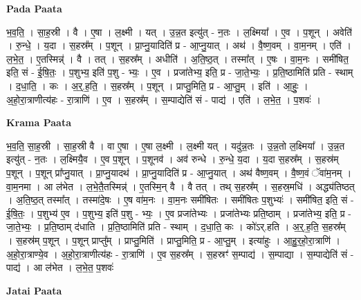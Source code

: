 \documentclass[17pt]{extarticle}
\begin{document}
\textbf{Pada Paata} \newline

भ॒व॒ति॒ । सा॒ह॒स्री । वै । ए॒षा । ल॒क्ष्मी । यत् । उ॒न्न॒त इत्यु॑त् - न॒तः । ल॒क्ष्मिया᳚ । ए॒व । प॒शून् । अवेति॑ । रु॒न्धे॒ । य॒दा । स॒हस्र᳚म् । प॒शून् । प्रा॒प्नु॒यादिति॑ प्र - आ॒प्नु॒यात् । अथ॑ । वै॒ष्ण॒वम् । वा॒म॒नम् । एति॑ । ल॒भे॒त॒ । ए॒तस्मिन्न्॑ । वै । तत् । स॒हस्र᳚म् । अधीति॑ । अ॒ति॒ष्ठ॒त् । तस्मा᳚त् । ए॒षः । वा॒म॒नः । समी॑षित॒ इति॒ सं - ई॒षि॒तः॒ । प॒शुभ्य॒ इति॑ प॒शु - भ्यः॒ । ए॒व । प्रजा॑तेभ्य॒ इति॒ प्र - जा॒ते॒भ्यः॒ । प्र॒ति॒ष्ठामिति॑ प्रति - स्थाम् । द॒धा॒ति॒ । कः । अ॒र्॒.ह॒ति॒ । स॒हस्र᳚म् । प॒शून् । प्राप्तु॒मिति॒ प्र - आ॒प्तु॒म् । इति॑ । आ॒हुः॒ । अ॒हो॒रा॒त्राणीत्य॑हः - रा॒त्राणि॑ । ए॒व । स॒हस्र᳚म् । स॒म्पाद्येति॑ सं - पाद्य॑ । एति॑ । ल॒भे॒त॒ । प॒शवः॑ ।  \newline


\textbf{Krama Paata} \newline

भ॒व॒ति॒ सा॒ह॒स्री । सा॒ह॒स्री वै । वा ए॒षा । ए॒षा ल॒क्ष्मी । ल॒क्ष्मी यत् । यदु॑न्न॒तः । उ॒न्न॒तो ल॒क्ष्मिया᳚ । उ॒न्न॒त इत्यु॑त् - न॒तः । ल॒क्ष्मियै॒व । ए॒व प॒शून् । प॒शूनव॑ । अव॑ रुन्धे । रु॒न्धे॒ य॒दा । य॒दा स॒हस्र᳚म् । स॒हस्र॑म् प॒शून् । प॒शून् प्रा᳚प्नु॒यात् । प्रा॒प्नु॒यादथ॑ । प्रा॒प्नु॒यादिति॑ प्र - आ॒प्नु॒यात् । अथ॑ वैष्ण॒वम् । वै॒ष्ण॒वं ॅवा॑म॒नम् । वा॒म॒नमा । आ ल॑भेत । ल॒भे॒तै॒तस्मिन्न्॑ । ए॒तस्मि॒न् वै । वै तत् । तथ् स॒हस्र᳚म् । स॒हस्र॒मधि॑ । अद्ध्य॑तिष्ठत् । अ॒ति॒ष्ठ॒त् तस्मा᳚त् । तस्मा॑दे॒षः । ए॒ष वा॑म॒नः । वा॒म॒नः समी॑षितः । समी॑षितः प॒शुभ्यः॑ । समी॑षित॒ इति॒ सं - ई॒षि॒तः॒ । प॒शुभ्य॑ ए॒व । प॒शुभ्य॒ इति॑ प॒शु - भ्यः॒ । ए॒व प्रजा॑तेभ्यः । प्रजा॑तेभ्यः प्रति॒ष्ठाम् । प्रजा॑तेभ्य॒ इति॒ प्र - जा॒ते॒भ्यः॒ । प्र॒ति॒ष्ठाम् द॑धाति । प्र॒ति॒ष्ठामिति॑ प्रति - स्थाम् । द॒धा॒ति॒ कः । को॑ऽर्.हति । अ॒र्॒.ह॒ति॒ स॒हस्र᳚म् । स॒हस्र॑म् प॒शून् । प॒शून् प्राप्तु᳚म् । प्राप्तु॒मिति॑ । प्राप्तु॒मिति॒ प्र - आ॒प्तु॒म् । इत्या॑हुः । आ॒हु॒र॒हो॒रा॒त्राणि॑ । अ॒हो॒रा॒त्राण्ये॒व । अ॒हो॒रा॒त्राणीत्य॑हः - रा॒त्राणि॑ । ए॒व स॒हस्र᳚म् । स॒हस्रꣳ॑ स॒म्पाद्य॑ । स॒म्पाद्या । स॒म्पाद्येति॑ सं - पाद्य॑ । आ ल॑भेत । ल॒भे॒त॒ प॒शवः॑ \newline

\textbf{Jatai Paata} \newline
\end{document}
